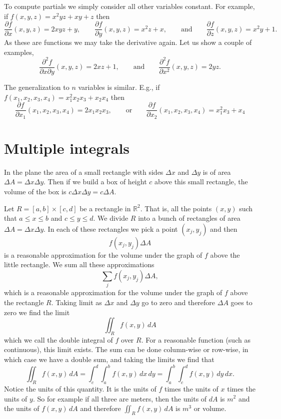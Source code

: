 \documentclass[11pt]{article}
\newcommand{\R}{{\mathbb{R}}}
\begin{document}
To compute partials we simply consider all other variables constant.
For example, if $f(x,y,z) = x^2yz + xy + z$ then
$$
\frac{\partial f}{\partial x}(x,y,z) = 2xyz + y,
\qquad
\frac{\partial f}{\partial y}(x,y,z) = x^2z + x,
\qquad \text{and} \qquad
\frac{\partial f}{\partial z}(x,y,z) = x^2y + 1 .
$$
As these are functions we may take the derivative again.  Let us show a couple of examples,
$$
\frac{\partial^2 f}{\partial x \partial y}(x,y,z) = 2xz + 1,
\qquad \text{and} \qquad
\frac{\partial^2 f}{\partial x^2}(x,y,z) = 2yz .
$$

The generalization to $n$ variables is similar.  E.g.,
if $f(x_1,x_2,x_3,x_4) = x_1^2x_2x_3 + x_2 x_4$ then
$$
\frac{\partial f}{\partial x_1}(x_1,x_2,x_3,x_4) = 2x_1 x_2 x_3,
\qquad \text{or} \qquad
\frac{\partial f}{\partial x_2}(x_1,x_2,x_3,x_4) = x_1^2 x_3 + x_4
$$

\section{Multiple integrals}

In the plane the area of a small rectangle with sides $\Delta x$ and $\Delta y$
is of area $\Delta A = \Delta x \Delta y$.
Then if we build a box of height $c$ above
this small rectangle, the volume of the box is $c \Delta x \Delta y = c \Delta A$.

Let $R = [a,b] \times [c,d]$ be a rectangle in $\R^2$.  That is, all the points
$(x,y)$ such that $a \leq x \leq b$ and $c \leq y \leq d$.
We divide $R$ into a bunch of rectangles of area $\Delta A = \Delta x \Delta y$.
In each of these rectangles we pick a point $(x_j,y_j)$ and then
$$
f(x_j,y_j) \Delta A
$$
is a reasonable approximation for the volume under the graph of $f$ above the little
rectangle.
We sum all these approximations
$$
\sum_j 
f(x_j,y_j) \Delta A ,
$$
which is a reasonable approximation for the volume under the graph of $f$ above the rectangle
$R$.
Taking limit as $\Delta x$ and $\Delta y$ go to zero and therefore $\Delta A$ goes to zero
we find the limit
$$
\iint_R f(x,y) \, dA
$$
which we call the double integral of $f$ over $R$.
For a reasonable function (such as continuous), this limit exists.
The sum can be done column-wise or row-wise, in which case we have a
double sum, and taking the limits we find that
$$
\iint_R f(x,y) \, dA
=
\int_c^d \int_a^b f(x,y) \, dx \, dy
=
\int_a^b \int_c^d f(x,y) \, dy \, dx .
$$
Notice the units of this quantity.  It is the units of $f$ times the units of $x$ times
the units of $y$.  So for example if all three are meters, then the units of $dA$ is $m^2$ and
the units of
$f(x,y) \, dA$
and therefore
$\iint_R f(x,y) \, dA$
is $m^3$ or volume.
\end{document}
